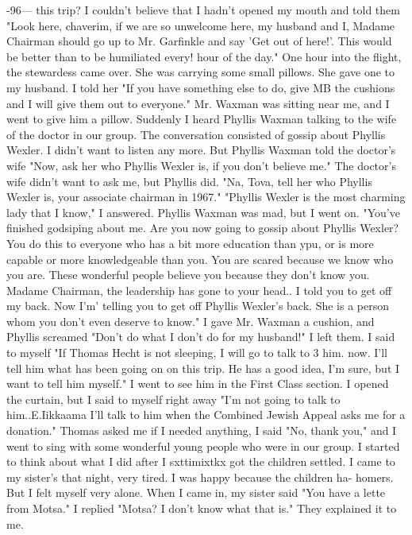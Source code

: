 -96— 
this trip?
I couldn't believe that I hadn't opened my mouth and told them "Look here, 
chaverim, if we are so unwelcome here, my husband and I, Madame Chairman should go up to 
Mr.
Garfinkle and say 'Get out of here!'.
This would be better than to be humiliated every!
hour of the day."
One hour into the flight, the stewardess came over.
She was carrying some small 
pillows.
She gave one to my husband.
I told her "If you have something else to do, give 
MB the cushions and I will give them out to everyone."
Mr.
Waxman was sitting near me, 
and I went to give him a pillow.
Suddenly I heard Phyllis Waxman talking to the wife of 
the doctor in our group.
The conversation consisted of gossip about Phyllis Wexler.
I 
didn't want to listen any more.
But Phyllis Waxman told the doctor's wife "Now, ask her 
who Phyllis Wexler is, if you don't believe me."
The doctor's wife didn't want to ask me, 
but Phyllis did.
"Na, Tova, tell her who Phyllis Wexler is, your associate chairman 
in 1967."
"Phyllis Wexler is the most charming lady that I know," I answered.
Phyllis Waxman 
was mad, but I went on.
"You've finished godsiping about me.
Are you now going to 
gossip about Phyllis Wexler?
You do this to everyone who has a bit more education than 
ypu, or is more capable or more knowledgeable than you.
You are scared because we know 
who you are.
These wonderful people believe you because they don't know you.
Madame 
Chairman, the leadership has gone to your head.. I told you to get off my back.
Now I'm' 
telling you to get off Phyllis Wexler's back.
She is a person whom you don't even deserve 
to know."
I gave Mr.
Waxman a cushion, and Phyllis screamed "Don't do what I don't do for 
my husband!"
I left them.
I said to myself "If Thomas Hecht is not sleeping, I will go to talk to 3 
him.
now.
I'll tell him what has been going on on this trip.
He has a good idea, I'm sure, 
but I want to tell him myself."
I went to see him in the First Class section.
I opened 
the curtain, but I said to myself right away "I'm not going to talk to him..E.Iikkaama I'll 
talk to him when the Combined Jewish Appeal asks me for a donation."
Thomas asked me 
if I needed anything, I said "No, thank you," and I went to sing with some wonderful 
young people who were in our group.
I started to think about what I did after I sxttimixtkx got the children settled.
I came to my sister's that night, very tired.
I was happy because the children ha-
homers.
But I felt myself very alone.
When I came in, my sister said "You have a lette 
from Motsa."
I replied "Motsa?
I don't know what that is."
They explained it to me.
